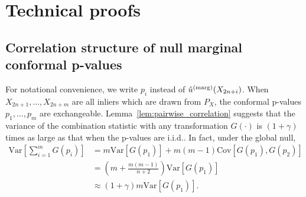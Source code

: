 \documentclass[11pt]{article}
\newtheorem{prop}{Proposition}
\def\R{\mathbb{R}}
\def\marg{\textnormal{(marg)}}
\begin{document}
\section{Technical proofs} \label{app:proofs}



\subsection{Correlation structure of null marginal conformal p-values} \label{app:correlation-structure}

For notational convenience, we write $p_i$ instead of $\hat{u}^\marg(X_{2n+i})$. When $X_{2n+1}, \ldots, X_{2n+m}$ are all inliers which are drawn from $P_{X}$, the conformal p-values $p_1, \ldots, p_m$ are exchangeable. 
Lemma~\ref{lem:pairwise_correlation} suggests that the variance of the combination statistic with any transformation $G(\cdot)$ is $(1 + \gamma)$ times as large as that when the p-values are i.i.d.. In fact, under the global null,
\begin{align*}
\mathrm{Var}\left[\sum_{i=1}^{m}G(p_i)\right]& = m\mathrm{Var}\left[ G(p_1)\right] + m(m-1)\mathrm{Cov}\left[ G(p_1), G(p_2) \right]\\
& = \left(m + \frac{m(m-1)}{n+2}\right)\mathrm{Var}\left[G(p_1)\right]\\
& \approx (1 + \gamma)m\mathrm{Var}\left[G(p_1)\right].
\end{align*}
\end{document}
